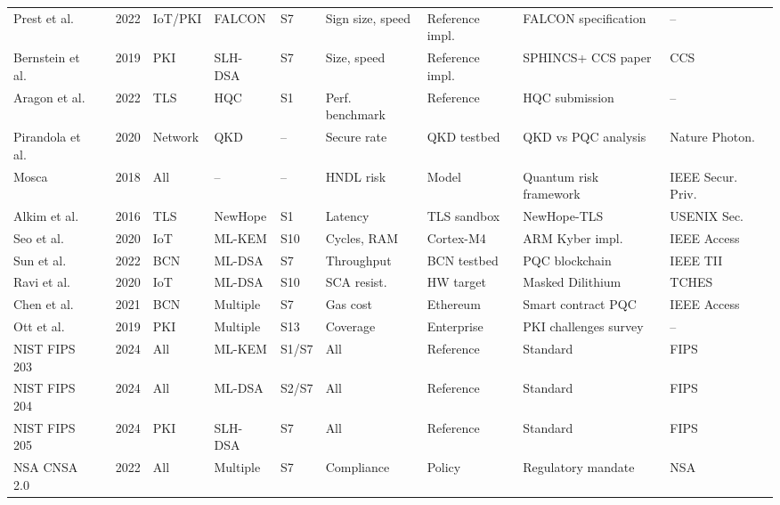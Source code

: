 \documentclass[journal]{IEEEtran}
\begin{document}
\begin{table}[!t]
\begin{tabular}{@{}L{2.5cm}C{1.0cm}C{1.3cm}C{1.3cm}C{1.3cm}C{1.3cm}C{1.2cm}C{2.0cm}C{1.5cm}@{}}
Prest et al.~\cite{prest2022falcon}               & 2022 & IoT/PKI & FALCON    & S7 & Sign size, speed & Reference impl. & FALCON specification & -- \\
Bernstein et al.~\cite{bernstein2019sphincs}      & 2019 & PKI     & SLH-DSA   & S7 & Size, speed & Reference impl. & SPHINCS+ CCS paper & CCS \\
Aragon et al.~\cite{aragon2022hqc}               & 2022 & TLS     & HQC       & S1 & Perf. benchmark & Reference & HQC submission & -- \\
Pirandola et al.~\cite{pirandola2020advances}     & 2020 & Network & QKD       & --  & Secure rate & QKD testbed & QKD vs PQC analysis & Nature Photon. \\
Mosca~\cite{mosca2018cybersecurity}               & 2018 & All     & --        & --  & HNDL risk & Model & Quantum risk framework & IEEE Secur. Priv. \\
Alkim et al.~\cite{alkim2016post}                 & 2016 & TLS     & NewHope   & S1 & Latency & TLS sandbox & NewHope-TLS & USENIX Sec. \\
Seo et al.~\cite{seo2020crystals}                & 2020 & IoT     & ML-KEM    & S10 & Cycles, RAM & Cortex-M4 & ARM Kyber impl. & IEEE Access \\
Sun et al.~\cite{sun2022blockchain}               & 2022 & BCN     & ML-DSA    & S7 & Throughput & BCN testbed & PQC blockchain & IEEE TII \\
Ravi et al.~\cite{ravi2020masking}                & 2020 & IoT     & ML-DSA    & S10 & SCA resist. & HW target & Masked Dilithium & TCHES \\
Chen et al.~\cite{chen2021blockchain}             & 2021 & BCN     & Multiple  & S7 & Gas cost & Ethereum & Smart contract PQC & IEEE Access \\
Ott et al.~\cite{ott2019identifying}              & 2019 & PKI     & Multiple  & S13 & Coverage & Enterprise & PKI challenges survey & -- \\
NIST FIPS 203~\cite{nistfips203}                  & 2024 & All     & ML-KEM    & S1/S7 & All & Reference & Standard & FIPS \\
NIST FIPS 204~\cite{nistfips204}                  & 2024 & All     & ML-DSA    & S2/S7 & All & Reference & Standard & FIPS \\
NIST FIPS 205~\cite{nistfips205}                  & 2024 & PKI     & SLH-DSA   & S7 & All & Reference & Standard & FIPS \\
NSA CNSA 2.0~\cite{nsacnsa2022}                   & 2022 & All     & Multiple  & S7 & Compliance & Policy & Regulatory mandate & NSA \\

\end{tabular}
\end{table}
\end{document}

